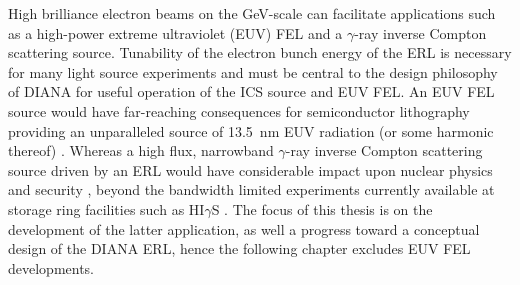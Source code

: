 \documentclass[../main.tex]{subfiles}
\begin{document}
High brilliance electron beams on the \si{\giga\electronvolt}-scale can facilitate applications such as a high-power extreme ultraviolet (EUV) FEL and a $\gamma$-ray inverse Compton scattering source. Tunability of the electron bunch energy of the ERL is necessary for many light source experiments and must be central to the design philosophy of DIANA for useful operation of the ICS source and EUV FEL. An EUV FEL source would have far-reaching consequences for semiconductor lithography providing an unparalleled source of 13.5~\si{\nano\meter} EUV radiation (or some harmonic thereof) \cite{socol2011compact}. Whereas a high flux, narrowband $\gamma$-ray inverse Compton scattering source driven by an ERL would have considerable impact upon nuclear physics and security \cite{budker2021expanding}, beyond the bandwidth limited experiments currently available at storage ring facilities such as HI$\gamma$S \cite{weller2009research}. The focus of this thesis is on the development of the latter application, as well a progress toward a conceptual design of the DIANA ERL, hence the following chapter excludes EUV FEL developments.
\end{document}
